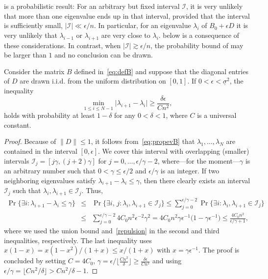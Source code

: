 \documentclass{siamart190516}
\providecommand{\abs}[1]{\lvert#1\rvert}
\begin{document}
 is a probabilistic result: For an arbitrary but fixed interval $\mathcal{I}$, it is very unlikely that more than one eigenvalue ends up in that interval, provided that the interval is sufficiently small, $\abs{\mathcal{I}} \ll \epsilon /n$. In particular, for an eigenvalue $\lambda_i$ of $B_0 + \epsilon D$ it is very unlikely that $\lambda_{i-1}$ or $\lambda_{i+1}$ are very close to $\lambda_i$.  below is a consequence of these considerations. In contrast, when $\abs{\mathcal{I}} \gtrsim  \epsilon /n$, the probability bound of  may be larger than $1$ and no conclusion can be drawn.
\begin{theorem}
    \label{thmgap}
    Consider the matrix $B$ defined in~\eqref{eq:defB} and suppose that the diagonal entries of $D$ are drawn i.i.d. from the uniform distribution on $[0,1]$.
    If $0<\epsilon<\underline{\sigma}^{2}$, the inequality
    \begin{equation*}
        \min_{1\leq i\leq N-1}\abs{\lambda_{i+1}-\lambda_{i}} \geq \frac{\delta\epsilon}{Cn^{2}},
    \end{equation*}
    holds with probability at least $1-\delta$ for any $0<\delta<1$, where
$C$ is a universal constant.
\end{theorem}
\begin{proof}
Because of $\|D\| \le 1$, it follows from~\eqref{eq:propevB} that $\lambda_{1},\dotsc,\lambda_{N}$ are contained in the interval $[0,\epsilon]$.
We cover this interval with overlapping (smaller) intervals $\mathcal{I}_{j}=[j\gamma,(j+2)\gamma]$ for $j = 0,\ldots,\epsilon/\gamma-2$, where---for the moment---$\gamma$ is an arbitrary number such that $0<\gamma\leq \epsilon/2$ and $\epsilon/\gamma$ is an integer. 
If two neighboring eigenvalues satisfy $\lambda_{i+1}-\lambda_{i}\leq\gamma$, then there clearly exists an interval $\mathcal{I}_{j}$ such that $\lambda_{i},\lambda_{i+1}\in\mathcal{I}_{j}$. Thus, 
    \begin{eqnarray*}
        \Pr \{ \exists i\colon \lambda_{i+1}-\lambda_{i}\leq \gamma\} &\leq & 
        \Pr \{\exists i,\, j\colon \lambda_{i},\lambda_{i+1}\in\mathcal{I}_{j}\}\leq \sum_{j=0}^{\epsilon/\gamma-2}\Pr \{\exists i\colon \lambda_{i},\lambda_{i+1}\in\mathcal{I}_{j}\} \\
        &\le & \sum_{j=0}^{\epsilon/\gamma-2} 4 C_0 n^{2} \epsilon^{-2} \gamma^{2}= 4C_0 n^{2}\gamma \epsilon^{-1} \big(1-\gamma\epsilon^{-1} \big) \le \frac{4C_0 n^{2}}{\epsilon/\gamma+1},
    \end{eqnarray*}
    where we used the union bound and~\cref{repulsion} in the second and third inequalities, respectively. The last inequality uses $x(1-x) = x (1-x^2) / (1+x) \le x / (1+x)$ with $x = \gamma \epsilon^{-1}$.
    The proof is concluded by setting $C = 4C_0$, $\gamma = \epsilon/\lfloor \frac{Cn^{2}}{\delta}\rfloor\geq \frac{\delta\epsilon}{Cn^{2}}$ and using 
    ${\epsilon}/{\gamma} = \lfloor {Cn^{2}}/{\delta}\rfloor> {Cn^{2}}/{\delta}-1$.
\end{proof}
\end{document}
